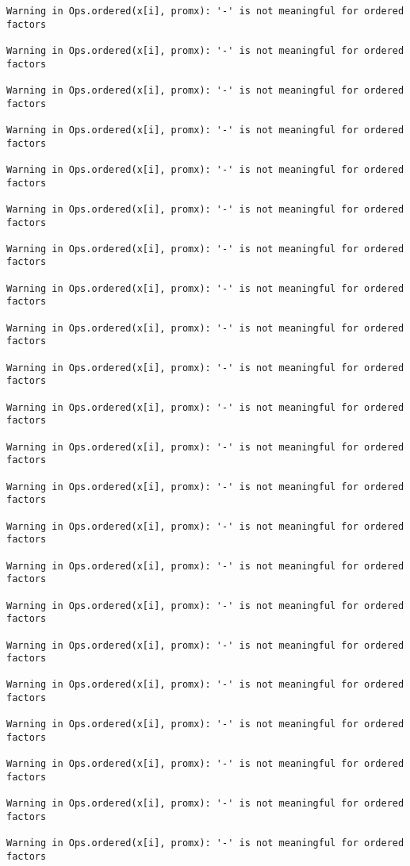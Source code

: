 \documentclass[]{article}
\begin{document}
\begin{verbatim}
Warning in Ops.ordered(x[i], promx): '-' is not meaningful for ordered
factors

Warning in Ops.ordered(x[i], promx): '-' is not meaningful for ordered
factors

Warning in Ops.ordered(x[i], promx): '-' is not meaningful for ordered
factors

Warning in Ops.ordered(x[i], promx): '-' is not meaningful for ordered
factors

Warning in Ops.ordered(x[i], promx): '-' is not meaningful for ordered
factors

Warning in Ops.ordered(x[i], promx): '-' is not meaningful for ordered
factors

Warning in Ops.ordered(x[i], promx): '-' is not meaningful for ordered
factors

Warning in Ops.ordered(x[i], promx): '-' is not meaningful for ordered
factors

Warning in Ops.ordered(x[i], promx): '-' is not meaningful for ordered
factors

Warning in Ops.ordered(x[i], promx): '-' is not meaningful for ordered
factors

Warning in Ops.ordered(x[i], promx): '-' is not meaningful for ordered
factors

Warning in Ops.ordered(x[i], promx): '-' is not meaningful for ordered
factors

Warning in Ops.ordered(x[i], promx): '-' is not meaningful for ordered
factors

Warning in Ops.ordered(x[i], promx): '-' is not meaningful for ordered
factors

Warning in Ops.ordered(x[i], promx): '-' is not meaningful for ordered
factors

Warning in Ops.ordered(x[i], promx): '-' is not meaningful for ordered
factors

Warning in Ops.ordered(x[i], promx): '-' is not meaningful for ordered
factors

Warning in Ops.ordered(x[i], promx): '-' is not meaningful for ordered
factors

Warning in Ops.ordered(x[i], promx): '-' is not meaningful for ordered
factors

Warning in Ops.ordered(x[i], promx): '-' is not meaningful for ordered
factors

Warning in Ops.ordered(x[i], promx): '-' is not meaningful for ordered
factors

Warning in Ops.ordered(x[i], promx): '-' is not meaningful for ordered
factors
\end{verbatim}
\end{document}
